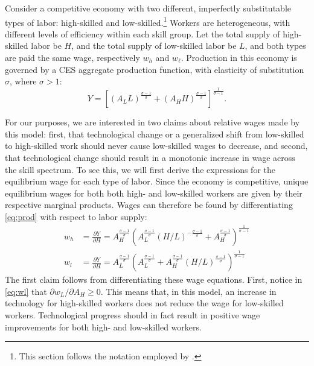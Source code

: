 Consider a competitive economy with two different, imperfectly substitutable types of labor: high-skilled and low-skilled.\footnote{This section follows the notation employed by \citet{Acemoglu2011}.} Workers are heterogeneous, with different levels of efficiency within each skill group. Let the total supply of high-skilled labor be $H$, and the total supply of low-skilled labor be $L$, and both types are paid the same wage, respectively $w_h$ and $w_\ell$. Production in this economy is governed by a CES aggregate production function, with elasticity of substitution $\sigma$, where $\sigma>1$:
\begin{equation}  \label{eq:prod}
Y = \left[
  \left(A_LL \right)^\frac{\sigma-1}{\sigma}
  +
  \left(A_HH \right)^\frac{\sigma-1}{\sigma}
  \right]^\frac{1}{\sigma-1}.
\end{equation}

For our purposes, we are interested in two claims about relative wages made by this model: first, that technological change or a generalized shift from low-skilled to high-skilled work should never cause low-skilled wages to decrease, and second, that technological change should result in a monotonic increase in wage across the skill spectrum. To see this, we will first derive the expressions for the equilibrium wage for each type of labor. Since the economy is competitive, unique equilibrium wages for both both high- and low-skilled workers are given by their respective marginal products. Wages can therefore be found by differentiating \eqref{eq:prod} with respect to labor supply:
\begin{align}
w_h &= \frac{\partial Y}{\partial H} 
     = A_H^\frac{\sigma-1}{\sigma}\left(
              A_L^{\frac{\sigma-1}{\sigma}} (H/L)^{-\frac{\sigma-1}{\sigma}} + A_H^{\frac{\sigma-1}{\sigma}}
        \right)^{\frac{1}{\sigma - 1}} \label{eq:wh} \\
w_l &= \frac{\partial Y}{\partial H} 
     = A_L^\frac{\sigma-1}{\sigma}\left(
              A_L^{\frac{\sigma-1}{\sigma}} + A_H^{\frac{\sigma-1}{\sigma}}(H/L)^{\frac{\sigma-1}{\sigma}}
        \right)^{\frac{1}{\sigma - 1}} \label{eq:wl}
\end{align}
The first claim follows from differentiating these wage equations. First, notice in \eqref{eq:wl} that $\partial w_L/\partial A_H \geq 0$. This means that, in this model, an increase in technology for high-skilled workers does not reduce the wage for low-skilled workers. Technological progress should in fact result in positive wage improvements for both high- and low-skilled workers. 

